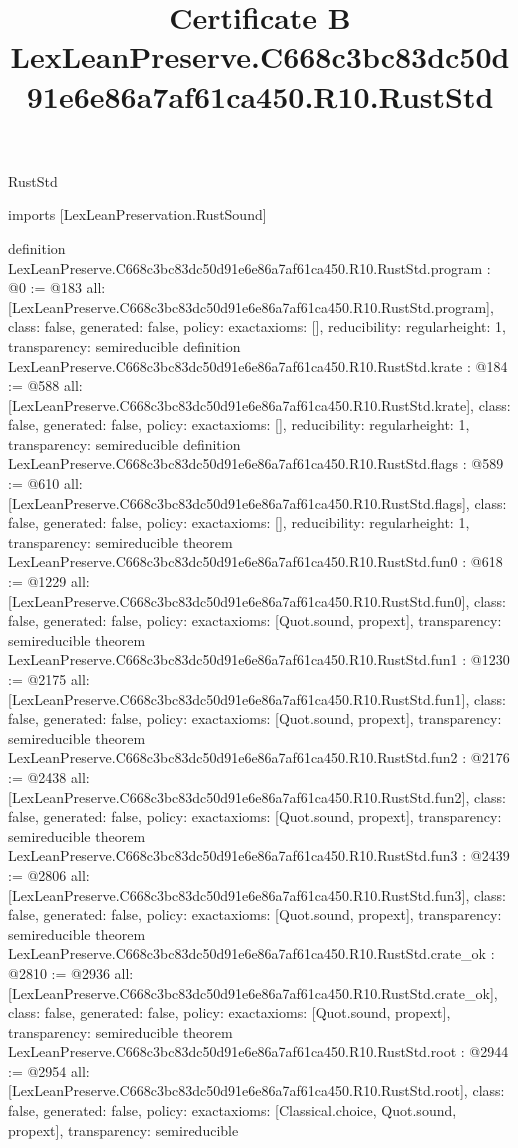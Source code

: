 \begin{lexlean}{RustStd}
\title{Certificate B LexLeanPreserve.C668c3bc83dc50d91e6e86a7af61ca450.R10.RustStd}
\begin{coremodule}
imports [LexLeanPreservation.RustSound]

definition LexLeanPreserve.C668c3bc83dc50d91e6e86a7af61ca450.R10.RustStd.program : @0 := @183 {
  all: [LexLeanPreserve.C668c3bc83dc50d91e6e86a7af61ca450.R10.RustStd.program],
  class: false,
  generated: false,
  policy: exact{axioms: []},
  reducibility: regular{height: 1},
  transparency: semireducible
}
definition LexLeanPreserve.C668c3bc83dc50d91e6e86a7af61ca450.R10.RustStd.krate : @184 := @588 {
  all: [LexLeanPreserve.C668c3bc83dc50d91e6e86a7af61ca450.R10.RustStd.krate],
  class: false,
  generated: false,
  policy: exact{axioms: []},
  reducibility: regular{height: 1},
  transparency: semireducible
}
definition LexLeanPreserve.C668c3bc83dc50d91e6e86a7af61ca450.R10.RustStd.flags : @589 := @610 {
  all: [LexLeanPreserve.C668c3bc83dc50d91e6e86a7af61ca450.R10.RustStd.flags],
  class: false,
  generated: false,
  policy: exact{axioms: []},
  reducibility: regular{height: 1},
  transparency: semireducible
}
theorem LexLeanPreserve.C668c3bc83dc50d91e6e86a7af61ca450.R10.RustStd.fun0 : @618 := @1229 {
  all: [LexLeanPreserve.C668c3bc83dc50d91e6e86a7af61ca450.R10.RustStd.fun0],
  class: false,
  generated: false,
  policy: exact{axioms: [Quot.sound, propext]},
  transparency: semireducible
}
theorem LexLeanPreserve.C668c3bc83dc50d91e6e86a7af61ca450.R10.RustStd.fun1 : @1230 := @2175 {
  all: [LexLeanPreserve.C668c3bc83dc50d91e6e86a7af61ca450.R10.RustStd.fun1],
  class: false,
  generated: false,
  policy: exact{axioms: [Quot.sound, propext]},
  transparency: semireducible
}
theorem LexLeanPreserve.C668c3bc83dc50d91e6e86a7af61ca450.R10.RustStd.fun2 : @2176 := @2438 {
  all: [LexLeanPreserve.C668c3bc83dc50d91e6e86a7af61ca450.R10.RustStd.fun2],
  class: false,
  generated: false,
  policy: exact{axioms: [Quot.sound, propext]},
  transparency: semireducible
}
theorem LexLeanPreserve.C668c3bc83dc50d91e6e86a7af61ca450.R10.RustStd.fun3 : @2439 := @2806 {
  all: [LexLeanPreserve.C668c3bc83dc50d91e6e86a7af61ca450.R10.RustStd.fun3],
  class: false,
  generated: false,
  policy: exact{axioms: [Quot.sound, propext]},
  transparency: semireducible
}
theorem LexLeanPreserve.C668c3bc83dc50d91e6e86a7af61ca450.R10.RustStd.crate_ok : @2810 := @2936 {
  all: [LexLeanPreserve.C668c3bc83dc50d91e6e86a7af61ca450.R10.RustStd.crate_ok],
  class: false,
  generated: false,
  policy: exact{axioms: [Quot.sound, propext]},
  transparency: semireducible
}
theorem LexLeanPreserve.C668c3bc83dc50d91e6e86a7af61ca450.R10.RustStd.root : @2944 := @2954 {
  all: [LexLeanPreserve.C668c3bc83dc50d91e6e86a7af61ca450.R10.RustStd.root],
  class: false,
  generated: false,
  policy: exact{axioms: [Classical.choice, Quot.sound, propext]},
  transparency: semireducible
}


\end{coremodule}
\end{lexlean}
